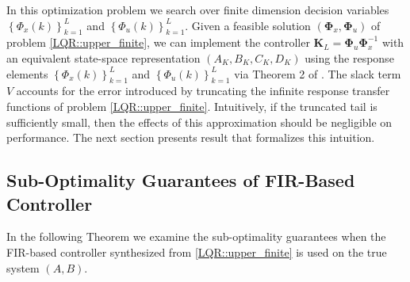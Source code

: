 \documentclass{article}[12pt]
\begin{document}
In this optimization problem we search over finite dimension decision variables $\left\{\Phi_{x}(k)\right\}_{k=1}^{L}$ and $\left\{\Phi_{u}(k)\right\}_{k=1}^{L}$.
Given a feasible solution $(\mathbf{\Phi}_{x},\mathbf{\Phi}_{u})$ of problem \eqref{LQR::upper_finite}, we can implement the controller $\mathbf{K}_{L}=\mathbf{\Phi}_{u} \mathbf{\Phi}_{x}^{-1}$ with an equivalent state-space representation $\left(A_{K}, B_{K}, C_{K}, D_{K}\right)$ using the response elements $\left\{\Phi_{x}(k)\right\}_{k=1}^{L}$ and $\left\{\Phi_{u}(k)\right\}_{k=1}^{L}$ via Theorem 2 of \cite{anderson2017structured}.
The slack term $V$ accounts for the error introduced by truncating the infinite response transfer functions of problem \eqref{LQR::upper_finite}. Intuitively, if the truncated tail is sufficiently small, then the effects of this approximation should be negligible on performance. The next section presents result that formalizes this intuition.

\subsection{Sub-Optimality Guarantees of FIR-Based Controller}

In the following Theorem we examine the sub-optimality guarantees when the FIR-based controller synthesized from \eqref{LQR::upper_finite} is used on the true system $(A,B)$.
\end{document}
